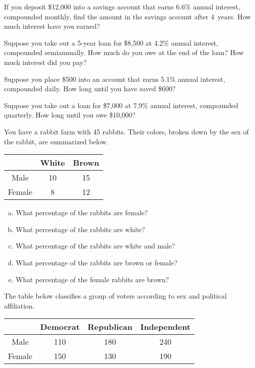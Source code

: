 \documentclass[11pt,letterpaper]{article}
\begin{document}

\problem If you deposit \$12,000 into a savings account that earns 6.6\% annual interest, compounded monthly, find the amount in the savings account after 4~years. How much interest have you earned? \pspace

\problem Suppose you take out a 5-year loan for \$8,500 at 4.2\% annual interest, compounded semiannually. How much do you owe at the end of the loan? How much interest did you pay? \pspace

\problem Suppose you place \$500 into an account that earns 5.1\% annual interest, compounded daily. How long until you have saved \$600? \pspace

\problem Suppose you take out a loan for \$7,000 at 7.9\% annual interest, compounded quarterly. How long until you owe \$10,000? \pspace

\problem You have a rabbit farm with 45 rabbits. Their colors, broken down by the sex of the rabbit, are summarized below.
	\begin{table}[!ht]
	\centering
	\begin{tabular}{|c|c|c|} \hline
	& White & Brown \\ \hline
	Male &10 & 15 \\ \hline
	Female & 8 & 12 \\ \hline
	\end{tabular}
	\end{table}

\begin{enumerate}[(a)]
\item What percentage of the rabbits are female?
\item What percentage of the rabbits are white?
\item What percentage of the rabbits are white and male?
\item What percentage of the rabbits are brown or female?
\item What percentage of the female rabbits are brown?
\end{enumerate} \pspace

\problem The table below classifies a group of voters according to sex and political affiliation. 
	\begin{table}[!ht]
	\centering
	\begin{tabular}{|c|c|c|c|} \hline
	& Democrat & Republican & Independent \\ \hline
	Male &110 & 180 & 240 \\ \hline
	Female & 150 & 130 & 190 \\ \hline
	\end{tabular}
	\end{table}
\end{document}
